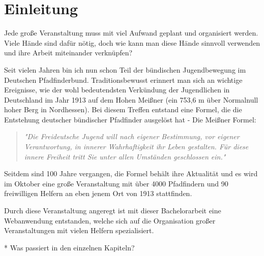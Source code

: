 \chapter{Einleitung}
Jede große Veranstaltung muss mit viel Aufwand geplant und organisiert werden. Viele Hände sind dafür nötig, doch wie kann man diese Hände sinnvoll verwenden und ihre Arbeit miteinander verknüpfen?\par

Seit vielen Jahren bin ich nun schon Teil der bündischen Jugendbewegung im Deutschen Pfadfinderbund. Traditionsbewusst erinnert man sich an wichtige Ereignisse, wie der wohl bedeutendsten Verkündung der Jugendlichen in Deutschland im Jahr 1913 auf dem Hohen Meißner (ein 753,6 m über Normalnull hoher Berg in Nordhessen). Bei diesem Treffen entstand eine Formel, die die Entstehung deutscher bündischer Pfadfinder ausgelöst hat - Die Meißner Formel:
\begin{quote}
	\textit{"Die Freideutsche Jugend will nach eigener Bestimmung, vor eigener Verantwortung, in innerer Wahrhaftigkeit ihr Leben gestalten. Für diese innere Freiheit tritt Sie unter allen Umständen geschlossen ein."}\cite[S. 109]{meissnerformel}
\end{quote}
Seitdem sind 100 Jahre vergangen, die Formel behält ihre Aktualität und es wird im Oktober eine große Veranstaltung mit über 4000 Pfadfindern und 90 freiwilligen Helfern an eben jenem Ort von 1913 stattfinden.\par

Durch diese Veranstaltung angeregt ist mit dieser Bachelorarbeit eine Webanwendung entstanden, welche sich auf die Organisation großer Veranstaltungen mit vielen Helfern spezialisiert.

* Was passiert in den einzelnen Kapiteln?